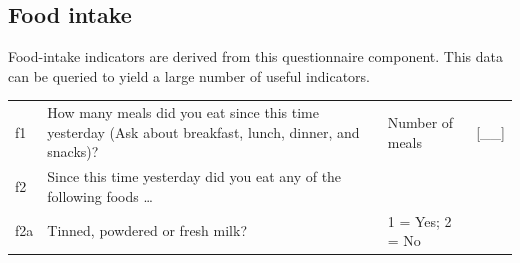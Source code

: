 \documentclass[12pt,a4paper]{book}
\theoremstyle{definition}
\theoremstyle{definition}
\theoremstyle{definition}
\theoremstyle{remark}
\begin{document}
\hypertarget{food-intake}{%
\subsection{Food intake}\label{food-intake}}

Food-intake indicators are derived from this questionnaire component.
This data can be queried to yield a large number of useful indicators.

\begin{longtable}[]{@{}llll@{}}
\toprule
\begin{minipage}[t]{0.09\columnwidth}\raggedright
f1\strut
\end{minipage} & \begin{minipage}[t]{0.41\columnwidth}\raggedright
How many meals did you eat since this time yesterday (Ask about
breakfast, lunch, dinner, and snacks)?\strut
\end{minipage} & \begin{minipage}[t]{0.25\columnwidth}\raggedright
Number of meals\strut
\end{minipage} & \begin{minipage}[t]{0.13\columnwidth}\raggedright
{[}\_\_{]}\strut
\end{minipage}\tabularnewline
\begin{minipage}[t]{0.09\columnwidth}\raggedright
f2\strut
\end{minipage} & \begin{minipage}[t]{0.41\columnwidth}\raggedright
Since this time yesterday did you eat any of the following foods
\ldots{}\strut
\end{minipage} & \begin{minipage}[t]{0.25\columnwidth}\raggedright
\strut
\end{minipage} & \begin{minipage}[t]{0.13\columnwidth}\raggedright
\strut
\end{minipage}\tabularnewline
\begin{minipage}[t]{0.09\columnwidth}\raggedright
f2a\strut
\end{minipage} & \begin{minipage}[t]{0.41\columnwidth}\raggedright
Tinned, powdered or fresh milk?\strut
\end{minipage} & \begin{minipage}[t]{0.25\columnwidth}\raggedright
1 = Yes; 2 = No\strut
\end{minipage} & \begin{minipage}[t]{0.13\columnwidth}\raggedright

\end{minipage}
\end{longtable}
\end{document}
